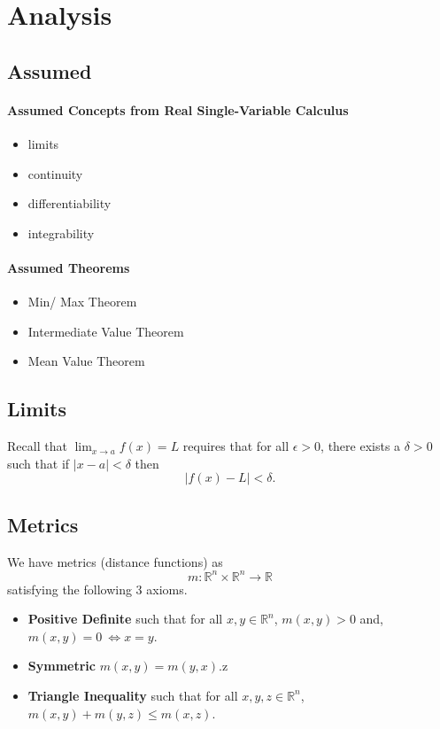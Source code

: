 
\section{Analysis}

\subsection{Assumed}
\paragraph{Assumed Concepts from Real Single-Variable Calculus}
\begin{itemize}
    \item limits
    \item continuity
    \item differentiability
    \item integrability
\end{itemize}

\paragraph{Assumed Theorems}
\begin{itemize}
    \item Min/ Max Theorem
    \item Intermediate Value Theorem
    \item Mean Value Theorem
\end{itemize}

\subsection{Limits}
Recall that \(\lim_{x\to a} f(x) = L\) requires that for all
\(\epsilon > 0\), there exists a \(\delta > 0\) such that
if \(|x-a| < \delta\)
then
\[|f(x) - L|  < \delta.\]



\subsection{Metrics}
We have metrics (distance functions) as
\[m: \mathbb{R}^n\times\mathbb{R}^n \to \mathbb{R}\]
satisfying the following 3 axioms.
\begin{itemize}
    \item \textbf{Positive Definite} such that for all \(x,y\in\mathbb{R}^n\),
    \(m(x,y) > 0\) and, \(m(x,y) = 0\ \Leftrightarrow x = y\).
    \item \textbf{Symmetric} \(m(x,y) = m(y, x)\).z
    \item \textbf{Triangle Inequality} such that for all \(x,y,z\in\mathbb{R}^n\),
    \(m(x,y) + m(y, z) \leq m(x, z)\).
\end{itemize}

